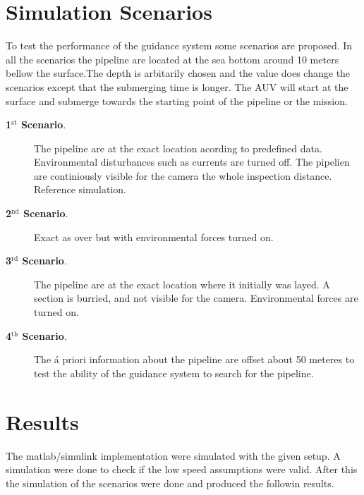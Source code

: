 \section{Simulation Scenarios}
	To test the performance of the guidance system some scenarios are proposed. In all the scenarios the
	pipeline are located at the sea bottom around 10 meters bellow the surface.The depth is arbitarily
	chosen and the value does change the scenarios except that the submerging time is longer. The AUV 
	will start at the surface and submerge towards the starting point of the pipeline or the mission. 
	\begin{description}
		\item[\textbf{1$^{\mathrm{st}}$ Scenario}.] The pipeline are at the exact location acording 
		to predefined data. Environmental disturbances such as currents are turned off. The pipelien are
		continiously visible for the camera the whole inspection distance. Reference simulation.
		\item[\textbf{2$^{\mathrm{nd}}$ Scenario}.] Exact as over but with environmental forces turned on.
		\item[\textbf{3$^{\mathrm{rd}}$ Scenario}.] The pipeline are at the exact location where 
		it initially was layed. A section is burried, and not visible for the camera. Environmental
		forces are turned on.
		\item[\textbf{4$^{\mathrm{th}}$ Scenario}.] The \'a priori information about the pipeline 
		are offset about 50 meteres to test the ability of the guidance system to search for the pipeline.
	\end{description}


\section{Results}
	The matlab/simulink implementation were simulated with the given setup. A simulation were done to
	check if the low speed assumptions were valid. After this the simulation of the scenarios were done
	and produced the followin results.


